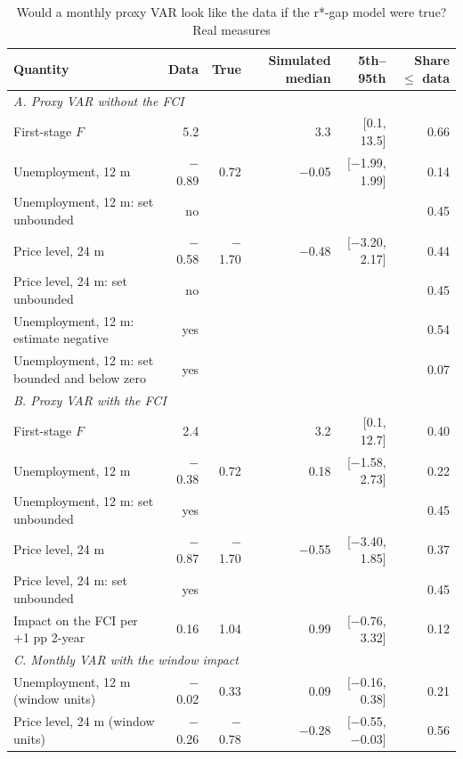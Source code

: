 \begin{table}[p]\centering\footnotesize\setlength{\tabcolsep}{3pt}
\caption{Would a monthly proxy VAR look like the data if the r*-gap model were true? Real measures}\label{tab:proxysimreal}
\begin{tabular}{lrrrrr}\toprule Quantity & Data & True & Simulated median & 5th--95th & Share $\le$ data\\ \midrule
\multicolumn{6}{l}{\textit{A. Proxy VAR without the FCI}}\\
\quad First-stage $F$ & 5.2 &  & 3.3 & [0.1, 13.5] & 0.66\\
\quad Unemployment, 12 m & $-$0.89 & 0.72 & $-$0.05 & [$-$1.99, 1.99] & 0.14\\
\quad Unemployment, 12 m: set unbounded & no &  &  &  & 0.45\\
\quad Price level, 24 m & $-$0.58 & $-$1.70 & $-$0.48 & [$-$3.20, 2.17] & 0.44\\
\quad Price level, 24 m: set unbounded & no &  &  &  & 0.45\\
\quad Unemployment, 12 m: estimate negative & yes &  &  &  & 0.54\\
\quad Unemployment, 12 m: set bounded and below zero & yes &  &  &  & 0.07\\
\multicolumn{6}{l}{\textit{B. Proxy VAR with the FCI}}\\
\quad First-stage $F$ & 2.4 &  & 3.2 & [0.1, 12.7] & 0.40\\
\quad Unemployment, 12 m & $-$0.38 & 0.72 & 0.18 & [$-$1.58, 2.73] & 0.22\\
\quad Unemployment, 12 m: set unbounded & yes &  &  &  & 0.45\\
\quad Price level, 24 m & $-$0.87 & $-$1.70 & $-$0.55 & [$-$3.40, 1.85] & 0.37\\
\quad Price level, 24 m: set unbounded & yes &  &  &  & 0.45\\
\quad Impact on the FCI per +1 pp 2-year & 0.16 & 1.04 & 0.99 & [$-$0.76, 3.32] & 0.12\\
\multicolumn{6}{l}{\textit{C. Monthly VAR with the window impact}}\\
\quad Unemployment, 12 m (window units) & $-$0.02 & 0.33 & 0.09 & [$-$0.16, 0.38] & 0.21\\
\quad Price level, 24 m (window units) & $-$0.26 & $-$0.78 & $-$0.28 & [$-$0.55, $-$0.03] & 0.56\\
\bottomrule\end{tabular}

\end{table}
